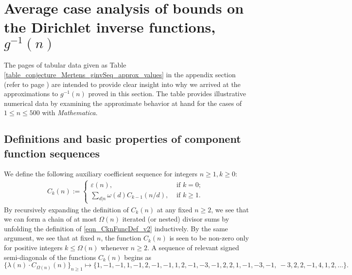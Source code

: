 \documentclass[11pt,reqno,a4letter]{article}
\numberwithin{figure}{section}
\numberwithin{table}{section}
\newcommand{\seqnum}[1]{\href{http://oeis.org/#1}{\color{ProcessBlue}{\underline{#1}}}}
\theoremstyle{plain}
\numberwithin{theorem}{section}
\theoremstyle{definition}
\begin{document}
\newpage
\section{Average case analysis of bounds on the Dirichlet inverse functions, $g^{-1}(n)$} 
\label{Section_InvFunc_PreciseExpsAndAsymptotics} 

The pages of tabular data given as Table \ref{table_conjecture_Mertens_ginvSeq_approx_values} 
in the appendix section (refer to 
page \pageref{table_conjecture_Mertens_ginvSeq_approx_values}) are intended to 
provide clear insight into why we arrived at the approximations to 
$g^{-1}(n)$ proved in this section. The table provides illustrative 
numerical data by examining the approximate behavior 
at hand for the cases of $1 \leq n \leq 500$ with \emph{Mathematica}. 

\subsection{Definitions and basic properties of component function sequences} 

We define the following auxiliary coefficient sequence for integers $n \geq 1, k \geq 0$: 
\begin{align} 
\label{eqn_CknFuncDef_v2} 
C_k(n) := \begin{cases} 
     \varepsilon(n), & \text{ if $k = 0$; } \\ 
     \sum\limits_{d|n} \omega(d) C_{k-1}(n/d), & \text{ if $k \geq 1$. } 
     \end{cases} 
\end{align} 
By recursively expanding the definition of $C_k(n)$ 
at any fixed $n \geq 2$, we see that 
we can form a chain of at most $\Omega(n)$ iterated (or nested) divisor sums by 
unfolding the definition of \eqref{eqn_CknFuncDef_v2} inductively. 
By the same argument, we see that at fixed $n$, the function 
$C_k(n)$ is seen to be non-zero only for positive integers 
$k \leq \Omega(n)$ whenever $n \geq 2$. 
A sequence of relevant signed semi-diagonals of the functions $C_k(n)$ begins as 
\cite[\seqnum{A008480}]{OEIS} 
\[
\{\lambda(n) \cdot C_{\Omega(n)}(n) \}_{n \geq 1} \mapsto \{
     1, -1, -1, 1, -1, 2, -1, -1, 1, 2, -1, -3, -1, 2, 2, 1, -1, -3, -1, \
     -3, 2, 2, -1, 4, 1, 2, \ldots \}. 
\]
\end{document}
